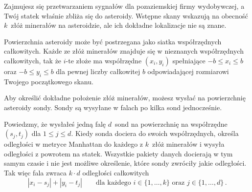

\noindent
Zajmujesz się przetwarzaniem sygnałów dla pozaziemskiej firmy wydobywczej, a Twój statek właśnie zbliża się do asteroidy. 
Wstępne skany wskazują na obecność $k$~złóż minerałów na asteroidzie, ale ich dokładne lokalizacje nie są znane.

\medskip

Powierzchnia asteroidy może być postrzegana jako siatka współrzędnych całkowitych.
Każde ze złóż minerałów znajduje się w nieznanych współrzędnych całkowitych, tak że $i$-te złoże ma współrzędne $(x_i, y_i)$ spełniające
$-b \le x_i \le b$ oraz $-b\le y_i \le b$ %
dla pewnej liczby całkowitej $b$ odpowiadającej rozmiarowi Twojego początkowego skanu.

Aby określić dokładne położenie złóż minerałów, możesz wysłać na powierzchnię asteroidy sondy. 
Sondy są wysyłane w falach po kilka sond jednocześnie.

Powiedzmy, że wysłałeś jedną falę $d$~sond na powierzchnię na współrzędne $(s_j,t_j)$ dla $1\leq j\leq d$.
Kiedy sonda dociera do swoich współrzędnych, określa odległości w metryce Manhattan do każdego z $k$~złóż minerałów i wysyła odległości z powrotem na statek. 
Wszystkie pakiety danych docierają w tym samym czasie i nie jest możliwe określenie, które sondy zwróciły jakie odległości. 
Tak więc fala zwraca $k\cdot d$ odległości całkowitych
\[|x_i-s_j| + |y_i - t_j| \qquad\text{dla każdego } i \in \{1,\ldots,k\} \text{ oraz } j \in\{ 1,\ldots,d\}\,.\]

